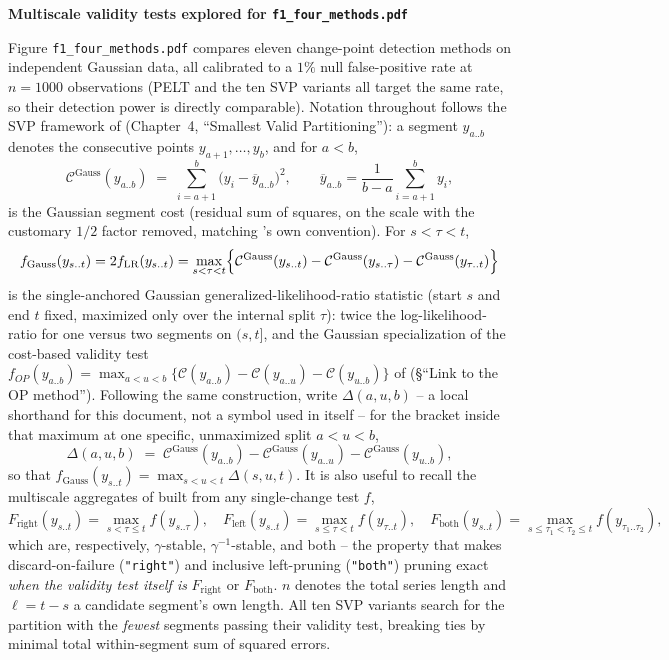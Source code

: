 \documentclass[11pt]{article}
\newcommand{\C}{\mathcal{C}}
\begin{document}
\begin{center}
{\large\bfseries Multiscale validity tests explored for \texttt{f1\_four\_methods.pdf}}
\end{center}

Figure \texttt{f1\_four\_methods.pdf} compares eleven change-point
detection methods on independent Gaussian data, all calibrated to a $1\%$
null false-positive rate at $n=1000$ observations (PELT and the ten SVP
variants all target the same rate, so their detection power is directly
comparable). Notation throughout follows the SVP framework of
\cite{runge2026svp} (Chapter~4, ``Smallest Valid Partitioning''): a
segment $y_{a..b}$ denotes the consecutive points $y_{a+1},\dots,y_b$, and
for $a<b$,
\[
\C^{\text{Gauss}}(y_{a..b}) \;=\; \sum_{i=a+1}^{b}\bigl(y_i-\overline{y}_{a..b}\bigr)^2,
\qquad \overline{y}_{a..b}=\frac{1}{b-a}\sum_{i=a+1}^{b}y_i,
\]
is the Gaussian segment cost (residual sum of squares, on the scale with
the customary $1/2$ factor removed, matching \cite{runge2026svp}'s own
convention). For $s<\tau<t$,
\[
f_{\mathrm{Gauss}}(y_{s..t})
= 2f_{\mathrm{LR}}(y_{s..t})
= \max_{s<\tau<t}\Bigl\{\C^{\text{Gauss}}(y_{s..t})-\C^{\text{Gauss}}(y_{s..\tau})-\C^{\text{Gauss}}(y_{\tau..t})\Bigr\}
\]
is the single-anchored Gaussian generalized-likelihood-ratio statistic
(start $s$ and end $t$ fixed, maximized only over the internal split
$\tau$): twice the log-likelihood-ratio for one versus two segments on
$(s,t]$, and the Gaussian specialization of the cost-based validity test
$f_{OP}(y_{a..b})=\max_{a<u<b}\{\C(y_{a..b})-\C(y_{a..u})-\C(y_{u..b})\}$
of \cite{runge2026svp} (\S``Link to the OP method''). Following the same
construction, write $\Delta(a,u,b)$ -- a local shorthand for this
document, not a symbol used in \cite{runge2026svp} itself -- for the
bracket inside that maximum at one specific, unmaximized split $a<u<b$,
\[
\Delta(a,u,b) \;=\; \C^{\text{Gauss}}(y_{a..b})-\C^{\text{Gauss}}(y_{a..u})-\C^{\text{Gauss}}(y_{u..b}),
\]
so that $f_{\mathrm{Gauss}}(y_{s..t})=\max_{s<u<t}\Delta(s,u,t)$. It is
also useful to recall the multiscale aggregates of \cite{runge2026svp}
built from any single-change test $f$,
\[
F_{\mathrm{right}}(y_{s..t})=\max_{s<\tau\le t}f(y_{s..\tau}),\quad
F_{\mathrm{left}}(y_{s..t})=\max_{s\le \tau<t}f(y_{\tau..t}),\quad
F_{\mathrm{both}}(y_{s..t})=\max_{s\le \tau_1<\tau_2\le t}f(y_{\tau_1..\tau_2}),
\]
which are, respectively, $\gamma$-stable, $\gamma^{-1}$-stable, and both
-- the property that makes discard-on-failure (\texttt{"right"}) and
inclusive left-pruning (\texttt{"both"}) pruning exact \emph{when the
validity test itself is} $F_{\mathrm{right}}$ or $F_{\mathrm{both}}$.
$n$ denotes the total series length and $\ell=t-s$ a candidate segment's
own length. All ten SVP variants search for the partition with the
\emph{fewest} segments passing their validity test, breaking ties by
minimal total within-segment sum of squared errors.
\end{document}
